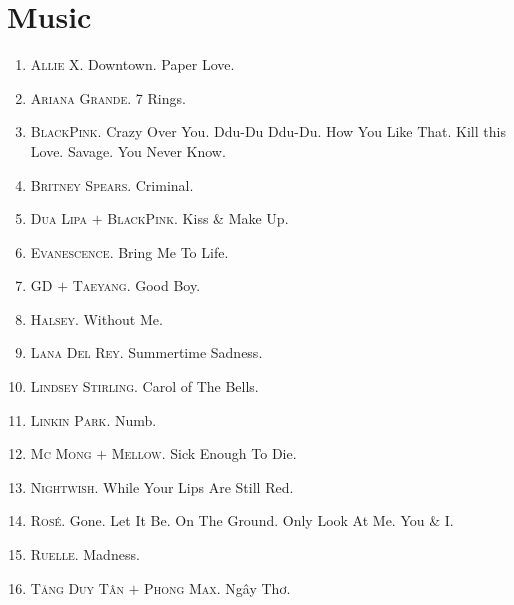\documentclass{article}
\begin{document}
\section{Music}
\begin{enumerate}
	\item \textsc{Allie X.} Downtown. Paper Love.
	\item \textsc{Ariana Grande.} 7 Rings.
	\item \textsc{BlackPink.} Crazy Over You. Ddu-Du Ddu-Du. How You Like That. Kill this Love. Savage. You Never Know.
	\item \textsc{Britney Spears.} Criminal.
	\item \textsc{Dua Lipa $+$ BlackPink.} Kiss \& Make Up.
	\item \textsc{Evanescence.} Bring Me To Life.
	\item \textsc{GD $+$ Taeyang.} Good Boy.
	\item \textsc{Halsey.} Without Me.
	\item \textsc{Lana Del Rey.} Summertime Sadness.
	\item \textsc{Lindsey Stirling.} Carol of The Bells.
	\item \textsc{Linkin Park.} Numb.
	\item \textsc{Mc Mong $+$ Mellow.} Sick Enough To Die.
	\item \textsc{Nightwish.} While Your Lips Are Still Red.
	\item \textsc{Ros\'e.} Gone. Let It Be. On The Ground. Only Look At Me. You \& I.
	\item \textsc{Ruelle.} Madness.
	\item \textsc{Tăng Duy Tân $+$ Phong Max.} Ngây Thơ.
\end{enumerate}

\end{document}
